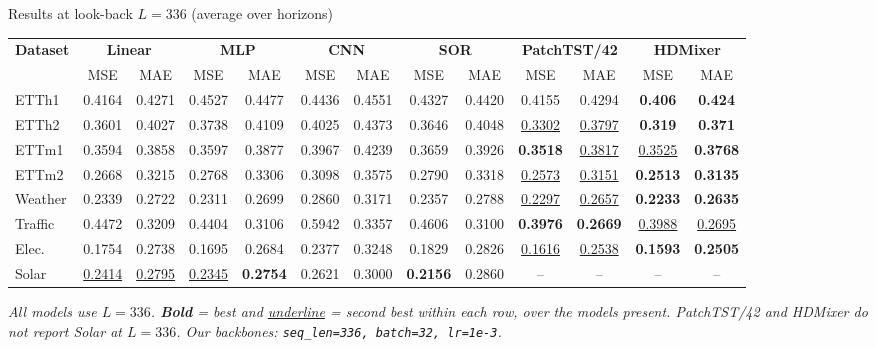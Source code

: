 \documentclass[aspectratio=169]{beamer}
\begin{document}
\begin{frame}{Results at look-back $L=336$ (average over horizons)}
\centering
\fontsize{6.5}{8}\selectfont
\setlength{\tabcolsep}{3pt}
\renewcommand{\arraystretch}{1.2}
\begin{tabular}{@{}l | cc | cc | cc | cc || cc | cc@{}}
  \toprule
  \multirow{2}{*}{\textbf{Dataset}}
    & \multicolumn{2}{c}{\textbf{Linear}} & \multicolumn{2}{c}{\textbf{MLP}}
    & \multicolumn{2}{c}{\textbf{CNN}}    & \multicolumn{2}{c}{\textbf{SOR}}
    & \multicolumn{2}{c}{\textbf{PatchTST/42}} & \multicolumn{2}{c}{\textbf{HDMixer}} \\
    & MSE & MAE & MSE & MAE & MSE & MAE & MSE & MAE & MSE & MAE & MSE & MAE \\
  \midrule
  ETTh1   & 0.4164 & 0.4271 & 0.4527 & 0.4477 & 0.4436 & 0.4551 & 0.4327 & 0.4420 & 0.4155 & 0.4294 & \textbf{0.406} & \textbf{0.424} \\
  ETTh2   & 0.3601 & 0.4027 & 0.3738 & 0.4109 & 0.4025 & 0.4373 & 0.3646 & 0.4048 & \underline{0.3302} & \underline{0.3797} & \textbf{0.319} & \textbf{0.371} \\
  ETTm1   & 0.3594 & 0.3858 & 0.3597 & 0.3877 & 0.3967 & 0.4239 & 0.3659 & 0.3926 & \textbf{0.3518} & \underline{0.3817} & \underline{0.3525} & \textbf{0.3768} \\
  ETTm2   & 0.2668 & 0.3215 & 0.2768 & 0.3306 & 0.3098 & 0.3575 & 0.2790 & 0.3318 & \underline{0.2573} & \underline{0.3151} & \textbf{0.2513} & \textbf{0.3135} \\
  Weather & 0.2339 & 0.2722 & 0.2311 & 0.2699 & 0.2860 & 0.3171 & 0.2357 & 0.2788 & \underline{0.2297} & \underline{0.2657} & \textbf{0.2233} & \textbf{0.2635} \\
  Traffic & 0.4472 & 0.3209 & 0.4404 & 0.3106 & 0.5942 & 0.3357 & 0.4606 & 0.3100 & \textbf{0.3976} & \textbf{0.2669} & \underline{0.3988} & \underline{0.2695} \\
  Elec.   & 0.1754 & 0.2738 & 0.1695 & 0.2684 & 0.2377 & 0.3248 & 0.1829 & 0.2826 & \underline{0.1616} & \underline{0.2538} & \textbf{0.1593} & \textbf{0.2505} \\
  Solar   & \underline{0.2414} & \underline{0.2795} & \underline{0.2345} & \textbf{0.2754} & 0.2621 & 0.3000 & \textbf{0.2156} & 0.2860 & -- & -- & -- & -- \\
  \bottomrule
\end{tabular}

\vfill
{\fontsize{6}{7.2}\selectfont\textcolor{muted}{\textit{All models use $L=336$. \textbf{Bold} = best and
\underline{underline} = second best within each row, over the models
present. PatchTST/42 and HDMixer do not report Solar at $L=336$.
Our backbones: \texttt{seq\_len=336, batch=32, lr=1e-3}.}}}
\end{frame}
\end{document}
